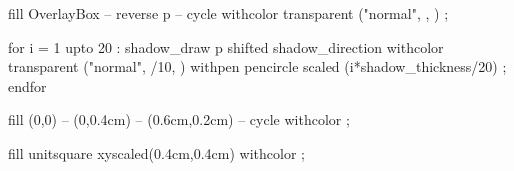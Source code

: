   fill OverlayBox -- reverse p -- cycle
       withcolor transparent ("normal",
         ,
         ) ;
\stopuseMPgraphic


  for i = 1 upto 20 :
  shadow_draw p shifted shadow_direction 
       withcolor transparent ("normal",
         /10, %
         ) 
       withpen pencircle scaled (i*shadow_thickness/20) ;
  endfor 
\stopuseMPgraphic



  fill (0,0) -- (0,0.4cm) -- (0.6cm,0.2cm) -- cycle 
       withcolor  ;
\stopuniqueMPgraphic

  fill unitsquare xyscaled(0.4cm,0.4cm) 
       withcolor  ;
\stopuniqueMPgraphic


\protect

\stopmodule
